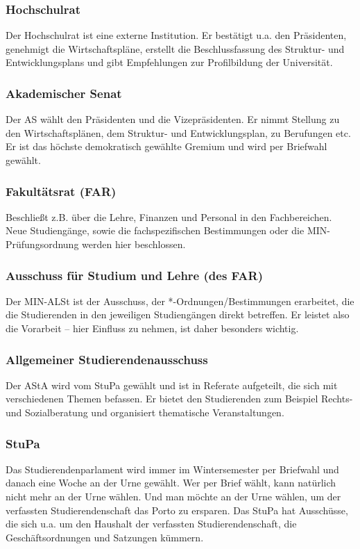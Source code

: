 \documentclass[a4paper,11pt]{scrartcl} %
\begin{document}
\subsubsection{Hochschulrat} Der Hochschulrat ist eine externe 
Institution. Er bestätigt u.a. den Präsidenten, genehmigt die 
Wirtschaftspläne, erstellt die Beschlussfassung des Struktur- 
und Entwicklungsplans und gibt Empfehlungen zur Profilbildung 
der Universität.

\subsubsection{Akademischer Senat} Der AS wählt den Präsidenten und 
die Vizepräsidenten. Er nimmt Stellung zu den Wirtschaftsplänen, 
dem Struktur- und Entwicklungsplan, zu Berufungen etc. Er ist 
das höchste demokratisch gewählte Gremium und wird per Briefwahl 
gewählt.

\subsubsection{Fakultätsrat (FAR)} Beschließt z.B. über die Lehre, 
Finanzen und Personal in den Fachbereichen. Neue Studiengänge, 
sowie die fachspezifischen Bestimmungen oder die 
MIN-Prüfungsordnung werden hier beschlossen.

\subsubsection{Ausschuss für Studium und Lehre (des FAR)} Der 
MIN-ALSt ist der Ausschuss, der *-Ordnungen/Bestimmungen 
erarbeitet, die die Studierenden in den jeweiligen Studiengängen 
direkt betreffen. Er leistet also die Vorarbeit -- hier Einfluss 
zu nehmen, ist daher besonders wichtig.

\subsubsection{Allgemeiner Studierendenausschuss}
Der AStA wird vom StuPa gewählt und ist in Referate aufgeteilt, die sich mit verschiedenen Themen befassen. 
Er bietet den Studierenden zum Beispiel Rechts- und Sozialberatung und organisiert thematische Veranstaltungen. 

\subsubsection{StuPa}
Das Studierendenparlament wird immer im Wintersemester per Briefwahl und danach eine Woche an der Urne gewählt. Wer per Brief wählt, kann natürlich nicht mehr an der Urne wählen. Und man möchte an der Urne wählen, um der verfassten Studierendenschaft das Porto zu ersparen. Das StuPa hat Ausschüsse, die sich u.a. um den Haushalt der verfassten Studierendenschaft, die Geschäftsordnungen und Satzungen kümmern.
\end{document}
